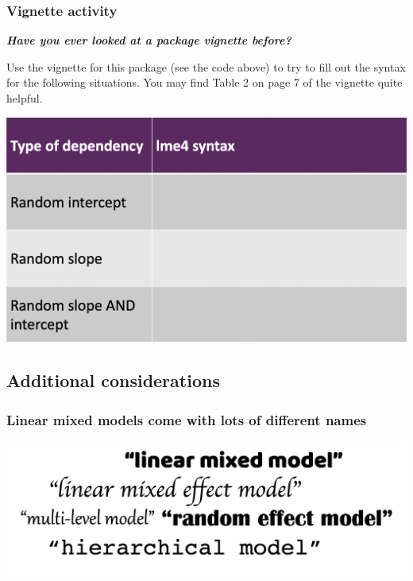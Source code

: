 \documentclass[
  openany]{book}
\begin{document}
\hypertarget{vignette-activity}{%
\subsubsection{Vignette activity}\label{vignette-activity}}

\textbf{\emph{Have you ever looked at a package vignette before?}}

Use the vignette for this package (see the code above) to try to fill out the syntax for the following situations. You may find Table 2 on page 7 of the vignette quite helpful.

\includegraphics[width=1\linewidth]{images/m3/table}

\hypertarget{additional-considerations}{%
\subsection{Additional considerations}\label{additional-considerations}}

\hypertarget{linear-mixed-models-come-with-lots-of-different-names}{%
\subsubsection{Linear mixed models come with lots of different names}\label{linear-mixed-models-come-with-lots-of-different-names}}

\includegraphics{images/m3/names_for_lmm.png}
\end{document}
